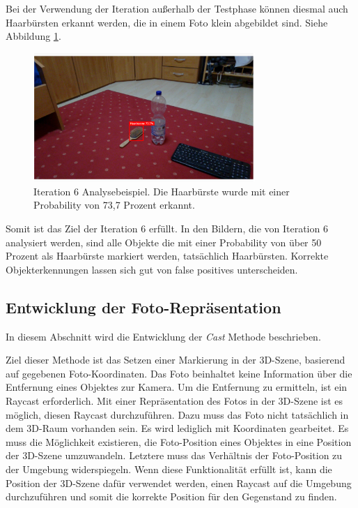 Bei der Verwendung der Iteration außerhalb der Testphase können diesmal auch Haarbürsten erkannt werden, die in einem Foto klein abgebildet sind. Siehe Abbildung \ref{img:it6}. 

\begin{figure}[H]
	\centering
	\includegraphics[width=0.75\textwidth]{images/it6pretty.png}
	\caption[Iteration 6 Analysebeispiel]{Iteration 6 Analysebeispiel. Die Haarbürste wurde mit einer Probability von 73,7 Prozent erkannt.}
	\label{img:it6}
\end{figure}

Somit ist das Ziel der Iteration 6 erfüllt. In den Bildern, die von Iteration 6 analysiert werden, sind alle Objekte die mit einer Probability von über 50 Prozent als Haarbürste markiert werden, tatsächlich Haarbürsten. Korrekte Objekterkennungen lassen sich gut von false positives unterscheiden. 


\subsection{Entwicklung der Foto-Repräsentation}
\label{section:devpixeltoworld}

In diesem Abschnitt wird die Entwicklung der \textit{Cast} Methode beschrieben.

Ziel dieser Methode ist das Setzen einer Markierung in der 3D-Szene, basierend auf gegebenen Foto-Koordinaten. Das Foto beinhaltet keine Information über die Entfernung eines Objektes zur Kamera. Um die Entfernung zu ermitteln, ist ein Raycast erforderlich. Mit einer Repräsentation des Fotos in der 3D-Szene ist es möglich, diesen Raycast durchzuführen. Dazu muss das Foto nicht tatsächlich in dem 3D-Raum vorhanden sein. Es wird lediglich mit Koordinaten gearbeitet. Es muss die Möglichkeit existieren, die Foto-Position eines Objektes in eine Position der 3D-Szene umzuwandeln. Letztere muss das Verhältnis der Foto-Position zu der Umgebung widerspiegeln. Wenn diese Funktionalität erfüllt ist, kann die Position der 3D-Szene dafür verwendet werden, einen Raycast auf die Umgebung durchzuführen und somit die korrekte Position für den Gegenstand zu finden.

